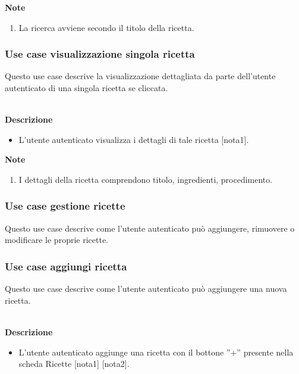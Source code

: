 \documentclass[a4paper,12pt]{article}
\begin{document}
\textbf{Note}
\begin{enumerate} \setlength\itemsep{0.01em}
\item La ricerca avviene secondo il titolo della ricetta.
\end{enumerate}



\subsubsection*{Use case visualizzazione singola ricetta}

Questo use case descrive  la visualizzazione dettagliata da parte dell'utente autenticato di una singola ricetta se cliccata.

\textbf{\\Descrizione}
\begin{itemize} \setlength\itemsep{0.01em}
\item L'utente autenticato visualizza i dettagli di tale ricetta [nota1].
\end{itemize}

\textbf{Note}
\begin{enumerate} \setlength\itemsep{0.01em}
\item I dettagli della ricetta comprendono titolo, ingredienti, procedimento.
\end{enumerate}







\subsubsection*{Use case gestione ricette}

Questo use case descrive come l'utente autenticato può aggiungere, rimuovere o modificare le proprie ricette.




\subsubsection*{Use case aggiungi ricetta}

Questo use case descrive come l'utente autenticato può aggiungere una nuova ricetta.

\textbf{\\Descrizione}
\begin{itemize} \setlength\itemsep{0.01em}
\item L'utente autenticato aggiunge una ricetta con il bottone ''+'' presente nella scheda Ricette [nota1] [nota2].
\end{itemize}
\end{document}

